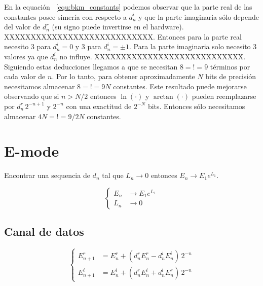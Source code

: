 \documentclass[10pt,a4paper]{book}
\begin{document}
   En la equaci\'on ~\ref{equ:bkm_constants} podemos observar que la parte real de las constantes posee simer\'ia con respecto a $d_n^i$ y que la parte imaginaria s\'olo depende del valor de $d_n^r$ (su signo puede invertirse en el hardware).
   XXXXXXXXXXXXXXXXXXXXXXXXXXXX.
   Entonces para la parte real necesito 3 para $d_n^i=0$ y 3 para $d_n^i=\pm 1$.
   Para la parte imaginaria solo necesito 3 valores ya que $d_n^i$ no influye.
   XXXXXXXXXXXXXXXXXXXXXXXXXXXX.
   Siguiendo estas deducciones llegamos a que se necesitan $8 =!= 9$ t\'erminos por cada valor de $n$. Por lo tanto, para obtener aproximadamente $N$ bits de precisi\'on necesitamos almacenar $8=!=9 N$ constantes. Este resultado puede mejorarse observando que si $n > N/2$ entonces $\ln(\cdot)$ y $\arctan(\cdot)$ pueden reemplazarse por $ d_n^r \, 2^{-n+1}$ y $2^{-n}$ con una exactitud de $2^{-N}$ bits.
   Entonces s\'olo necesitamos almacenar $4 N =!= 9/2 N$ constantes.



\section{E-mode}

   Encontrar una sequencia de $d_n$ tal que $L_n \rightarrow 0$ entonces $E_n \rightarrow E_1 e^{L_1}$.

\begin{equation} \label{eq:bkm_E_mode}
   \left\{
      \begin{aligned}
         E_n & \rightarrow E_1 e^{L_1} \\
         L_n & \rightarrow 0
      \end{aligned}
   \right.
\end{equation}

   \subsection{Canal de datos}
\begin{equation} \label{eq:bkm_eqs_E}
   \left\{
      \begin{aligned}
         E_{n+1}^r &= E_n^r + ( d_n^r E_n^r - d_n^i E_n^i ) \,2^{-n} \\
         E_{n+1}^i &= E_n^i + ( d_n^r E_n^i + d_n^i E_n^r ) \,2^{-n}
      \end{aligned}
   \right.
\end{equation}
\end{document}

